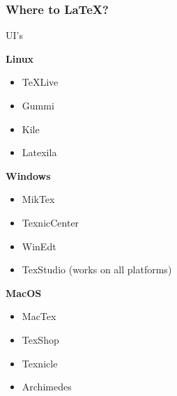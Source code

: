 \documentclass{beamer}
\renewcommand{\;}{\hspace{0.25em}}
\begin{document}
\begin{frame}
\frametitle{Where to \LaTeX?}
	\centering
	UI's
	\begin{multicols}{3}
		\hspace{-.8cm}\textbf{Linux}
		\begin{itemize}
			\item TeXLive
			\item Gummi
			\item Kile
			\item Latexila
		\end{itemize}
		\vfill
		\columnbreak
		\textbf{Windows}
		\begin{itemize}
			\item MikTex
			\item TexnicCenter
			\item WinEdt
			\item TexStudio (works on all platforms)
		\end{itemize}
		\vfill
		\columnbreak
		\hspace{-0.5cm}\textbf{MacOS}
		\begin{itemize}
			\item MacTex
			\item TexShop
			\item Texnicle
			\item Archimedes
		\end{itemize}
		\vfill
		\columnbreak
	\end{multicols}
	\vspace{5mm}
\end{frame}
\end{document}

